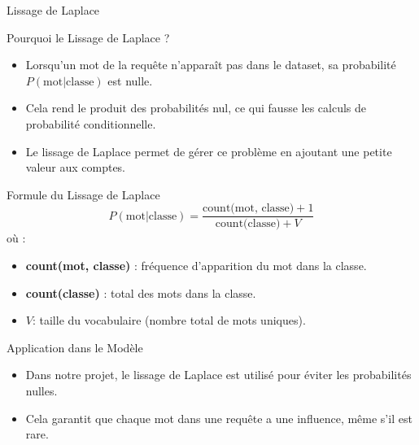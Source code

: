 \documentclass{beamer}
\begin{document}
\begin{frame}[allowframebreaks]{Lissage de Laplace}
    \begin{block}{Pourquoi le Lissage de Laplace ?}
        \begin{itemize}
            \item Lorsqu'un mot de la requête n'apparaît pas dans le dataset, sa probabilité \( P(\text{mot} | \text{classe}) \) est nulle.
            \item Cela rend le produit des probabilités nul, ce qui fausse les calculs de probabilité conditionnelle.
            \item Le lissage de Laplace permet de gérer ce problème en ajoutant une petite valeur aux comptes.
        \end{itemize}
    \end{block}

    \begin{block}{Formule du Lissage de Laplace}
        \[
        P(\text{mot} | \text{classe}) = \frac{\text{count(mot, classe)} + 1}{\text{count(classe)} + V}
        \]
        où :
        \begin{itemize}
            \item \textbf{count(mot, classe)} : fréquence d'apparition du mot dans la classe.
            \item \textbf{count(classe)} : total des mots dans la classe.
            \item \( V \): taille du vocabulaire (nombre total de mots uniques).
        \end{itemize}
    \end{block}

    \begin{block}{Application dans le Modèle}
        \begin{itemize}
            \item Dans notre projet, le lissage de Laplace est utilisé pour éviter les probabilités nulles.
            \item Cela garantit que chaque mot dans une requête a une influence, même s'il est rare.
        \end{itemize}
    \end{block}
\end{frame}
\end{document}
